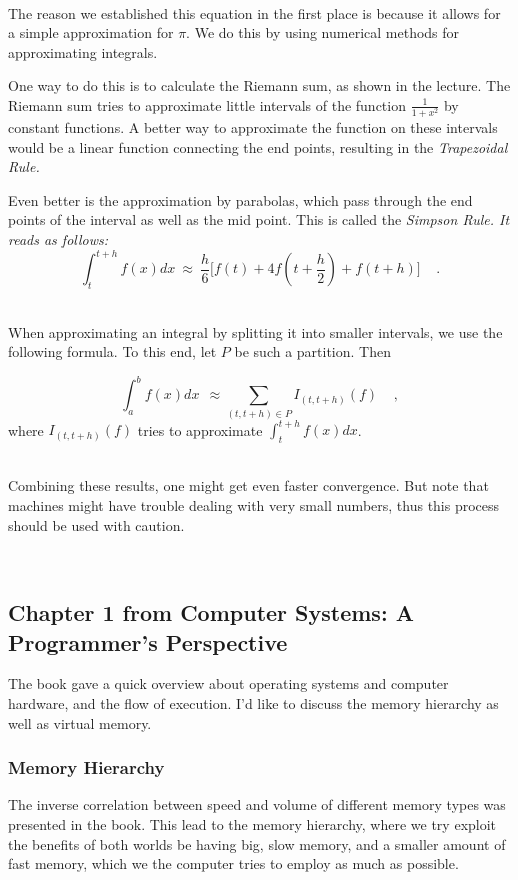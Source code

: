 \documentclass[../../main.tex]{subfiles}
\begin{document}
~\\
The reason we established this equation in the first place is because it allows for a simple approximation for $\pi$.
We do this by using numerical methods for approximating integrals.

One way to do this is to calculate the Riemann sum, as shown in the lecture.
The Riemann sum tries to approximate little intervals of the function $\frac{1}{1+x^2}$ by constant functions.
A better way to approximate the function on these intervals would be a linear function connecting the end points, resulting in the \em Trapezoidal Rule\em.

\noindent
Even better is the approximation by parabolas, which pass through the end points of the interval as well as the mid point. This is called the \em Simpson Rule\em.
It reads as follows:
\[
    \int_{t}^{t+h} f(x) dx \ \approx \ \frac{h}{6} \Big[ f(t) + 4f(t+\frac{h}{2}) + f(t+h) \Big] \ \ \ \ \ .
\]

~\\
When approximating an integral by splitting it into smaller intervals, we use the following formula.
To this end, let $P$ be such a partition. Then

\[
    \int_{a}^{b} f(x) dx \ \ \approx \sum_{(t, t+h) \in P} I_{(t, t+h)}(f) \ \ \ \ \ ,
\]
\noindent
where \(I_{(t, t+h)}(f)\) tries to approximate \(\int_{t}^{t+h} f(x) dx\).

~\\
Combining these results, one might get even faster convergence.
But note that machines might have trouble dealing with very small numbers, thus this process should be used with caution.

~\\
\subsection{Chapter 1 from Computer Systems: A Programmer's Perspective}
The book gave a quick overview about operating systems and computer hardware, and the flow of execution.
I'd like to discuss the memory hierarchy as well as virtual memory.

\subsubsection{Memory Hierarchy}
The inverse correlation between speed and volume of different memory types was presented in the book.
This lead to the memory hierarchy, where we try exploit the benefits of both worlds be having big, slow memory, and a smaller amount of fast memory, which we the computer tries to employ as much as possible.
\end{document}
